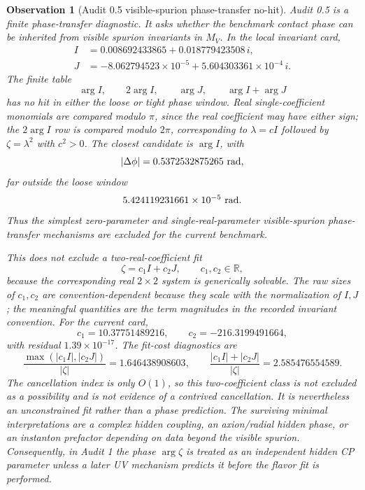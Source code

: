 \documentclass[
  aps,
  prd,
  preprint,
  nofootinbib,
  superscriptaddress,
  longbibliography
]{revtex4-2}
\newtheorem{observation}[theorem]{Observation}
\begin{document}
\begin{observation}[Audit 0.5 visible-spurion phase-transfer no-hit]
\label{obs:audit05-phase-transfer}
Audit 0.5 is a finite phase-transfer diagnostic.  It asks whether the
benchmark contact phase can be inherited from visible spurion invariants in
\(M_V\).  In the local invariant card,
\[
  \begin{aligned}
  I&=0.008692433865+0.018779423508\,i,\\
  J&=-8.062794523\times10^{-5}
     +5.604303361\times10^{-4}\,i .
  \end{aligned}
\]
The finite table
\[
  \arg I,\qquad 2\arg I,\qquad \arg J,\qquad \arg I+\arg J
\]
has no hit in either the loose or tight phase window.  Real single-coefficient
monomials are compared modulo \(\pi\), since the real coefficient may have
either sign; the \(2\arg I\) row is compared modulo \(2\pi\), corresponding to
\(\lambda=cI\) followed by \(\zeta=\lambda^2\) with \(c^2>0\).  The closest
candidate is \(\arg I\), with
\[
  |\Delta\phi|=0.5372532875265\ {\rm rad},
\]
far outside the loose window
\[
  5.424119231661\times10^{-5}\ {\rm rad}.
\]
Thus the simplest zero-parameter and single-real-parameter visible-spurion
phase-transfer mechanisms are excluded for the current benchmark.

This does not exclude a two-real-coefficient fit
\[
  \zeta=c_1 I+c_2J,\qquad c_1,c_2\in\mathbb R,
\]
because the corresponding real \(2\times2\) system is generically solvable.
The raw sizes of \(c_1,c_2\) are convention-dependent because they scale with
the normalization of \(I,J\); the meaningful quantities are the term
magnitudes in the recorded invariant convention.  For the current card,
\[
  c_1=10.37751489216,\qquad c_2=-216.3199491664,
\]
with residual \(1.39\times10^{-17}\).  The fit-cost diagnostics are
\[
  \frac{\max(|c_1I|,|c_2J|)}{|\zeta|}
  =1.646438908603,\qquad
  \frac{|c_1I|+|c_2J|}{|\zeta|}
  =2.585476554589 .
\]
The cancellation index is only \(O(1)\), so this two-coefficient class is not
excluded as a possibility and is not evidence of a contrived cancellation.
It is nevertheless an unconstrained fit rather than a phase prediction.  The
surviving minimal interpretations are a complex hidden coupling, an
axion/radial hidden phase, or an instanton prefactor depending on data beyond
the visible spurion.  Consequently, in Audit 1 the phase \(\arg\zeta\) is
treated as an independent hidden CP parameter unless a later UV mechanism
predicts it before the flavor fit is performed.
\end{observation}
\end{document}
